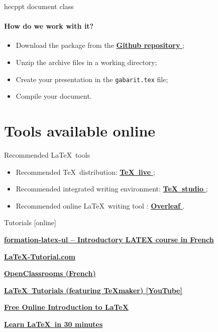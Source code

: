 \documentclass[aspectratio=1610,compress,t,gabaritb,french,english]{hecppt}
\newcommand{\HEClien}[2]{%
	\href{#1}{\textbf{#2} \faExternalLink}
}
\begin{document}
		\begin{frame}[c]{hecppt document class}
			\framesubtitle{How do we work with it?}
			\begin{itemize}
				\item Download the package from the \HEClien{https://github.com/metalogueur/hecppt/archive/master.zip}{Github repository};
				\item Unzip the archive files in a working directory;
				\item Create your presentation in the \texttt{gabarit.tex} file;
				\item Compile your document.
			\end{itemize}
		\end{frame}
	
\section{Tools available online}
		
		\begin{frame}[c]{Recommended \LaTeX\ tools}
			\begin{itemize}
				\item Recommended \TeX\ distribution: \HEClien{https://www.tug.org/texlive/}{\TeX\ live};
				\item Recommended integrated writing environment: \HEClien{https://www.texstudio.org/}{\TeX\ studio};
				\item Recommended online \LaTeX\ writing tool : \HEClien{https://www.overleaf.com/}{Overleaf}.
			\end{itemize}
		\end{frame}
	
		\begin{frame}[c]{Tutorials}
			
			\begin{thebibliography}{99}
					\HEClien{https://ctan.org/pkg/formation-latex-ul}{formation-latex-ul – Introductory LATEX course in French}
					\HEClien{https://www.latex-tutorial.com/}{\LaTeX -Tutorial.com}
					\HEClien{https://openclassrooms.com/fr/courses/1617396-redigez-des-documents-de-qualite-avec-latex}{OpenClassrooms (French)}
					\HEClien{https://www.youtube.com/playlist?list=PL1D4EAB31D3EBC449}{\LaTeX\ Tutorials (featuring \TeX maker) [YouTube]}
					\HEClien{https://www.overleaf.com/latex/learn/free-online-introduction-to-latex-part-1}{Free Online Introduction to \LaTeX}
					\HEClien{https://www.sharelatex.com/learn/latex/Learn\_LaTeX\_in\_30\_minutes}{Learn \LaTeX\ in 30 minutes}					
			\end{thebibliography}
		\end{frame}
	
\end{document}
